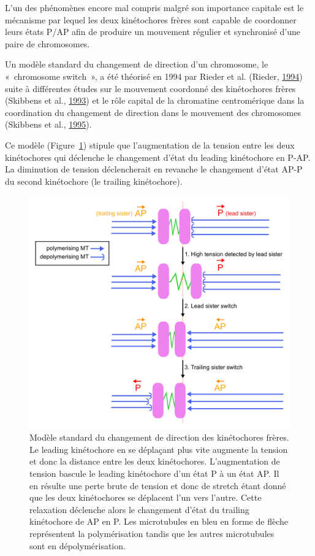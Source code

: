 \documentclass[12pt,a4paper,twoside,openright]{book}
\begin{document}
L'un des phénomènes encore mal compris malgré son importance capitale
est le mécanisme par lequel les deux kinétochores frères sont capable de
coordonner leurs états P/AP afin de produire un mouvement régulier et
synchronisé d'une paire de chromosomes.

Un modèle standard du changement de direction d'un chromosome, le
«~chromosome switch~», a été théorisé en 1994 par Rieder et al. (Rieder,
\protect\hyperlink{ref-Rieder1994}{1994}) suite à différentes études sur
le mouvement coordonné des kinétochores frères (Skibbens et al.,
\protect\hyperlink{ref-Skibbens1993}{1993}) et le rôle capital de la
chromatine centromérique dans la coordination du changement de direction
dans le mouvement des chromosomes (Skibbens et al.,
\protect\hyperlink{ref-Skibbens1995}{1995}).

Ce modèle (Figure~\ref{fig:run-switch}) stipule que l'augmentation de la
tension entre les deux kinétochores qui déclenche le changement d'état
du leading kinétochore en P-AP. La diminution de tension déclencherait
en revanche le changement d'état AP-P du second kinétochore (le trailing
kinétochore).

\begin{figure}[htbp]
\centering
\includegraphics{figures/intro/run_switch.png}
\caption{\label{fig:run-switch}Modèle standard du changement de
direction des kinétochores frères. Le leading kinétochore en se
déplaçant plus vite augmente la tension et donc la distance entre les
deux kinétochores. L'augmentation de tension bascule le leading
kinétochore d'un état P à un état AP. Il en résulte une perte brute de
tension et donc de stretch étant donné que les deux kinétochores se
déplacent l'un vers l'autre. Cette relaxation déclenche alors le
changement d'état du trailing kinétochore de AP en P. Les microtubules
en bleu en forme de flèche représentent la polymérisation tandis que les
autres microtubules sont en dépolymérisation.}
\end{figure}
\end{document}
